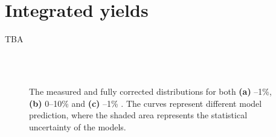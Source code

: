\section{Integrated yields}

TBA

\begin{figure}%
\\
\\
\caption{The measured and fully corrected \SOPT distributions for both \textbf{(a)} --1\%, \textbf{(b)} 0--10\% and \textbf{(c)} --1\% . The curves represent different model prediction, where the shaded area represents the statistical uncertainty of the models.}
\label{fig:rt:yield}
\end{figure}




